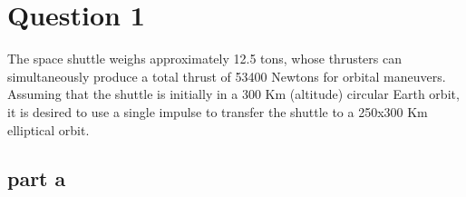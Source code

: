\section{Question 1}
The space shuttle weighs approximately 12.5 tons, whose thrusters can simultaneously produce a total thrust of 53400 Newtons for orbital maneuvers. Assuming that the shuttle is initially in a 300 Km (altitude) circular Earth orbit, it is desired to use a single impulse to transfer the shuttle to a 250x300 Km elliptical orbit.
\subsection{part a}